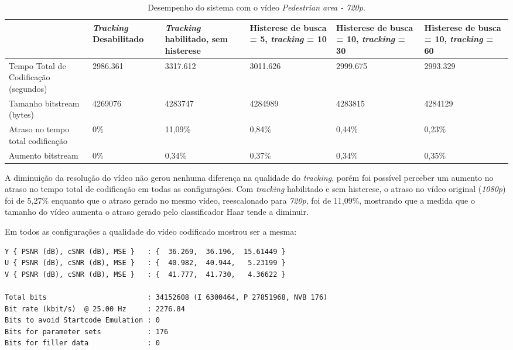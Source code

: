 \begin{table}[H]
\begin{center}
\begin{tabular}{|p{2.3cm}|p{2.3cm}|p{2.3cm}|p{2.3cm}|p{2.3cm}|p{2.3cm}|}
\hline
\textbf{} & \textbf{\textit{Tracking} Desabilitado} & \textbf{\textit{Tracking} habilitado, sem histerese} & \textbf{Histerese de busca = 5, \textit{tracking} = 10} & \textbf{Histerese de busca = 10, \textit{tracking} = 30} & \textbf{Histerese de busca = 10, \textit{tracking} = 60} \\
\hline
Tempo Total de Codificação (segundos) & 2986.361 & 3317.612 & 3011.626 & 2999.675 & 2993.329 \\
\hline
Tamanho bitstream (bytes) & 4269076 & 4283747 & 4284989 & 4283815 & 4284129 \\
\hline
Atraso no tempo total codificação & 0\% & 11,09\% & 0,84\% & 0,44\% & 0,23\% \\
\hline
Aumento bitstream  & 0\% & 0,34\% & 0,37\% & 0,34\% & 0,35\% \\
\hline
\end{tabular}
\caption{Desempenho do sistema com o vídeo \textit{Pedestrian area - 720p}.}
\label{tab:space_overhead}
\end{center}
\end{table}

A diminuição da resolução do vídeo não gerou nenhuma diferença na qualidade do \textit{tracking}, porém foi possível perceber um aumento no atraso no tempo total de codificação em todas as configurações. Com \textit{tracking} habilitado e sem histerese, o atraso no vídeo original (\textit{1080p}) foi de 5,27\% enquanto que o atraso gerado no mesmo vídeo, reescalonado para \textit{720p}, foi de 11,09\%, mostrando que a medida que o tamanho do vídeo aumenta o atraso gerado pelo classificador Haar tende a diminuir.

Em todos as configurações a qualidade do vídeo codificado mostrou ser a mesma:

\begin{lstlisting}
Y { PSNR (dB), cSNR (dB), MSE }   : {  36.269,  36.196,  15.61449 }
U { PSNR (dB), cSNR (dB), MSE }   : {  40.982,  40.944,   5.23199 }
V { PSNR (dB), cSNR (dB), MSE }   : {  41.777,  41.730,   4.36622 }

Total bits                        : 34152608 (I 6300464, P 27851968, NVB 176) 
Bit rate (kbit/s)  @ 25.00 Hz     : 2276.84
Bits to avoid Startcode Emulation : 0 
Bits for parameter sets           : 176 
Bits for filler data              : 0 
\end{lstlisting}


